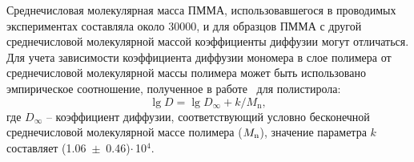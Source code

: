 Среднечисловая молекулярная масса ПММА, использовавшегося в проводимых экспериментах составляла около 30000, и для образцов ПММА с другой среднечисловой молекулярной массой коэффициенты диффузии могут отличаться.
Для учета зависимости коэффициента диффузии мономера в слое полимера от среднечисловой молекулярной массы полимера может быть использовано эмпирическое соотношение, полученное в работе~\cite{Berens_diffusion_Mn} для полистирола:
\begin{equation} \label{eq:diffusion_Mn}
	\lg D = \lg D_\infty + k / M_\mathrm{n},
\end{equation}
где $D_\infty$ -- коэффициент диффузии, соответствующий условно бесконечной среднечисловой молекулярной массе полимера ($M_\mathrm{n}$), значение параметра $k$ составляет (1.06~$\pm$~0.46)\:$\cdot$\,10$^\text{4}$.
